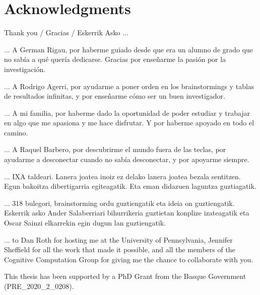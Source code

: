 \chapter*{Acknowledgments}

Thank you / Gracias / Eskerrik Asko ...

\vspace{5mm}

... A German Rigau, por haberme guiado desde que era un alumno de grado que no sabía a qué quería dedicarse. Gracias por enseñarme la pasión por la investigación.

\vspace{5mm}

... A Rodrigo Agerri, por ayudarme a poner orden en los brainstormings y tablas de resultados infinitas, y por enseñarme cómo ser un buen investigador.

\vspace{5mm}

... A mi familia, por haberme dado la oportunidad de poder estudiar y trabajar en algo que me apasiona y me hace disfrutar. Y por haberme apoyado en todo el camino. 

\vspace{5mm}

...  A Raquel Barbero, por descubrirme el mundo fuera de las teclas, por ayudarme a desconectar cuando no sabía desconectar, y por apoyarme siempre. 

\vspace{5mm}

... IXA taldeari. Lanera joatea inoiz ez delako lanera joatea bezala sentitzen. Egun bakoitza dibertigarria egiteagatik. Eta eman didazuen laguntza guztiagatik.

\vspace{5mm}

... 318 bulegori, brainstorming ordu guztiengatik eta ideia on guztiengatik. Eskerrik asko Ander Salaberriari bihurrikeria guztietan konplize izateagatik eta Oscar Sainzi elkarrekin egin dugun lan guztiengatik.

\vspace{5mm}

... to Dan Roth for hosting me at the University of Pennsylvania, Jennifer Sheffield for all the work that made it possible, and all the members of the Cognitive Computation Group for giving me the chance to collaborate with you.

\clearpage


This thesis has been supported by a PhD Grant from the Basque Government (PRE\_2020\_2\_0208). 


